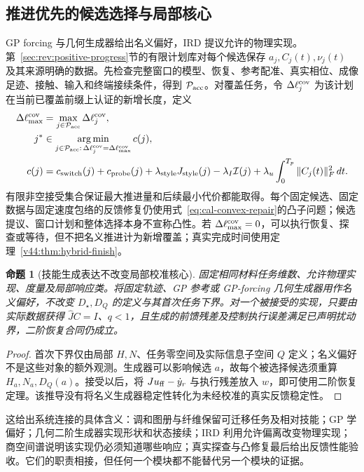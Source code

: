 \documentclass[11pt,a4paper]{article}
\numberwithin{equation}{section}
\newtheorem{proposition}[theorem]{命题}
\theoremstyle{definition}
\begin{document}
\subsection{推进优先的候选选择与局部核心}
GP forcing 与几何生成器给出名义偏好，IRD 提议允许的物理实现。第~\ref{sec:rev:positive-progress}节的有限计划库对每个候选保存 $a_j,C_j(t),\nu_j(t)$ 及其来源明确的数据。先检查完整窗口的模型、恢复、参考配准、真实相位、成像足迹、接触、输入和终端接续条件，得到 $\mathcal P_{\rm acc}$。对覆盖任务，令 $\Delta\ell_j^{\rm cov}$ 为该计划在当前已覆盖前缀上认证的新增长度，定义
\begin{align}
 \Delta\ell_{\max}^{\rm cov}&=\max_{j\in\mathcal P_{\rm acc}}\Delta\ell_j^{\rm cov},\\
 j^*&\in\operatorname*{arg\,min}_{j\in\mathcal P_{\rm acc}:
            \,\Delta\ell_j^{\rm cov}=\Delta\ell_{\max}^{\rm cov}} c(j),\\
 c(j)&=c_{\rm switch}(j)+c_{\rm probe}(j)
       +\lambda_{\rm style}J_{\rm style}(j)
       -\lambda_I\mathcal I(j)
       +\lambda_u\int_0^{T_p}\|C_j(t)\|_F^2\,dt.
 \label{eq:v43:joint-choice}
\end{align}
有限非空接受集合保证最大推进量和后续最小代价都能取得。每个固定候选、固定数据与固定速度包络的反馈修复仍使用式~\eqref{eq:cal-convex-repair}的凸子问题；候选提议、窗口计划和整体选择本身不宣称凸性。若 $\Delta\ell_{\max}^{\rm cov}=0$，可以执行恢复、探查或等待，但不把名义推进计为新增覆盖；真实完成时间使用定理~\ref{v44:thm:hybrid-finish}。

\begin{proposition}[技能生成表达不改变局部校准核心]
\label{prop:v43:core-unchanged}
固定相同材料任务维数、允许物理实现、度量及局部响应类。将固定轨迹、GP 参考或 GP-forcing 几何生成器用作名义偏好，不改变 $D_\star,D_Q$ 的定义与其首次任务下界。对一个被接受的实现，只要由实际数据获得 $\widehat JC=I$、$q<1$，且生成的前馈残差及控制执行误差满足已声明扰动界，二阶恢复合同仍成立。
\end{proposition}
\begin{proof}
首次下界仅由局部 $H,N$、任务零空间及实际信息子空间 $Q$ 定义；名义偏好不是这些对象的额外观测。生成器可以影响候选 $a$，故每个被选择候选须重算 $H_a,N_a,D_Q(a)$。接受以后，将 $Ju_{\rm ff}-\dot y_r$ 与执行残差放入 $w$，即可使用二阶恢复定理。该推导没有将名义生成器稳定性转化为未经校准的真实反馈稳定性。
\end{proof}

这给出系统连接的具体含义：调和图册与纤维保留可迁移任务及相对技能；GP 学偏好；几何二阶生成器实现形状和状态接续；IRD 利用允许偏离改变物理实现；商空间谱说明该实现仍必须知道哪些响应；真实探查与凸修复最后给出反馈性能验收。它们的职责相接，但任何一个模块都不能替代另一个模块的证据。
\end{document}

